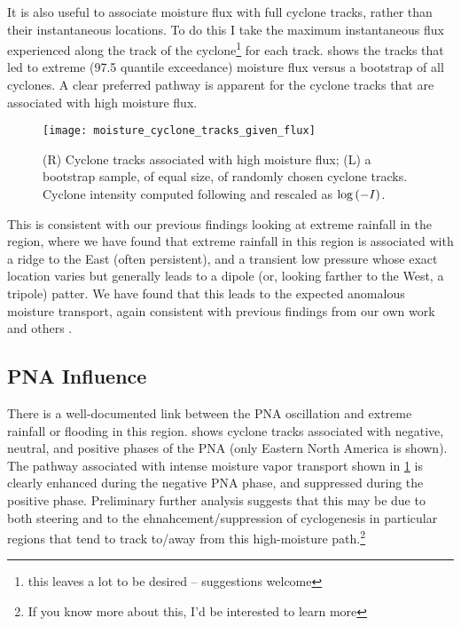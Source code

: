 \documentclass[12pt]{article}
\begin{document}
It is also useful to associate moisture flux with full cyclone tracks, rather than their instantaneous locations.
To do this I take the maximum instantaneous flux experienced along the track of the cyclone\footnote{this leaves a lot to be desired -- suggestions welcome} for each track.
 shows the tracks that led to extreme (97.5 quantile exceedance) moisture flux versus a bootstrap of all cyclones.
A clear preferred pathway is apparent for the cyclone tracks that are associated with high moisture flux.
\begin{figure}
    \centering
    \texttt{[image: moisture\_cyclone\_tracks\_given\_flux]}
    \caption{(R) Cyclone tracks associated with high moisture flux; (L) a bootstrap sample, of equal size, of randomly chosen cyclone tracks. Cyclone intensity computed following \citet{Booth2015} and rescaled as $\log \qty(-I)$.}
    \label{fig:tracks-given-flux}
\end{figure}

This is consistent with our previous findings looking at extreme rainfall in the region, where we have found that extreme rainfall in this region is associated with a ridge to the East (often persistent), and a transient low pressure whose exact location varies but generally leads to a dipole (or, looking farther to the West, a tripole) patter.
We have found that this leads to the expected anomalous moisture transport, again consistent with previous findings from our own work and others \citep{Nakamura2012,Lavers2013a,Steinschneider2016a}.


\subsection{PNA Influence}

There is a well-documented \citep[ie][]{Nakamura2012,Robertson2015,Steinschneider2015a} link between the PNA oscillation and extreme rainfall or flooding in this region.
 shows cyclone tracks associated with negative, neutral, and positive phases of the PNA (only Eastern North America is shown).
The pathway associated with intense moisture vapor transport shown in \cref{fig:tracks-given-flux} is clearly enhanced during the negative PNA phase, and suppressed during the positive phase.
Preliminary further analysis suggests that this may be due to both steering and to the ehnahcement/suppression of cyclogenesis in particular regions that tend to track to/away from this high-moisture path.\footnote{If you know more about this, I'd be interested to learn more}
\end{document}
